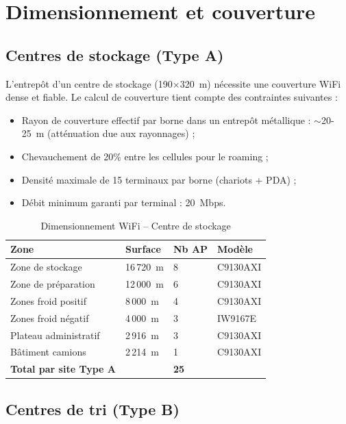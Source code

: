 \documentclass[12pt,a4paper]{report}
\begin{document}
\section{Dimensionnement et couverture}

\subsection{Centres de stockage (Type A)}

L'entrepôt d'un centre de stockage (190$\times$320~m) nécessite une couverture WiFi dense et fiable. Le calcul de couverture tient compte des contraintes suivantes :

\begin{itemize}
\item Rayon de couverture effectif par borne dans un entrepôt métallique : $\sim$20-25~m (atténuation due aux rayonnages) ;
\item Chevauchement de 20\% entre les cellules pour le roaming ;
\item Densité maximale de 15 terminaux par borne (chariots + PDA) ;
\item Débit minimum garanti par terminal : 20~Mbps.
\end{itemize}

\begin{table}[H]
\centering
\begin{tabularx}{\textwidth}{L{4cm}C{2cm}C{2cm}L{4cm}}
\toprule
\textbf{Zone} & \textbf{Surface} & \textbf{Nb AP} & \textbf{Modèle} \\
\midrule
Zone de stockage & 16\,720~m & 8 & C9130AXI \\
Zone de préparation & 12\,000~m & 6 & C9130AXI \\
Zones froid positif & 8\,000~m & 4 & C9130AXI \\
Zones froid négatif & 4\,000~m & 3 & IW9167E \\
Plateau administratif & 2\,916~m & 3 & C9130AXI \\
Bâtiment camions & 2\,214~m & 1 & C9130AXI \\
\midrule
\textbf{Total par site Type A} & & \textbf{25} & \\
\bottomrule
\end{tabularx}
\caption{Dimensionnement WiFi -- Centre de stockage}
\label{tab:wifi_typeA}
\end{table}

\subsection{Centres de tri (Type B)}
\end{document}
